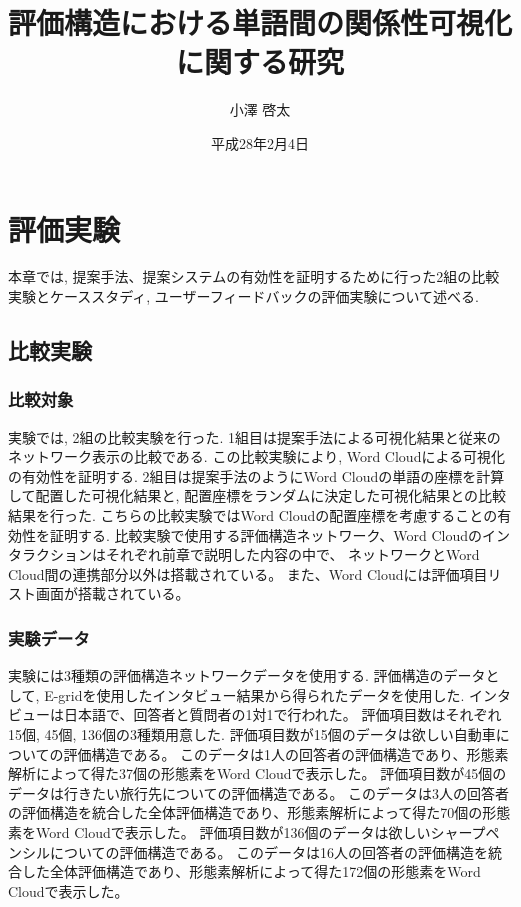 \documentclass[syuuron]{kuee}
\title{評価構造における単語間の関係性可視化に関する研究}
\author{小澤 啓太}
\date{平成28年2月4日}
\begin{document}
\maketitle
\tableofcontents


\chapter{評価実験}
	本章では, 提案手法、提案システムの有効性を証明するために行った2組の比較実験とケーススタディ, ユーザーフィードバックの評価実験について述べる. 
	\section{比較実験}
		\subsection{比較対象}
			実験では, 2組の比較実験を行った. 
			1組目は提案手法による可視化結果と従来のネットワーク表示の比較である. 
			この比較実験により, Word Cloudによる可視化の有効性を証明する. 
			2組目は提案手法のようにWord Cloudの単語の座標を計算して配置した可視化結果と, 配置座標をランダムに決定した可視化結果との比較結果を行った. 
			こちらの比較実験ではWord Cloudの配置座標を考慮することの有効性を証明する. 
			比較実験で使用する評価構造ネットワーク、Word Cloudのインタラクションはそれぞれ前章で説明した内容の中で、
			ネットワークとWord Cloud間の連携部分以外は搭載されている。
			また、Word Cloudには評価項目リスト画面が搭載されている。
			
		\subsection{実験データ}
			実験には3種類の評価構造ネットワークデータを使用する. 
			評価構造のデータとして, E-gridを使用したインタビュー結果から得られたデータを使用した.
			インタビューは日本語で、回答者と質問者の1対1で行われた。
			評価項目数はそれぞれ15個, 45個, 136個の3種類用意した. 
			評価項目数が15個のデータは欲しい自動車についての評価構造である。
			このデータは1人の回答者の評価構造であり、形態素解析によって得た37個の形態素をWord Cloudで表示した。
			評価項目数が45個のデータは行きたい旅行先についての評価構造である。
			このデータは3人の回答者の評価構造を統合した全体評価構造であり、形態素解析によって得た70個の形態素をWord Cloudで表示した。
			評価項目数が136個のデータは欲しいシャープペンシルについての評価構造である。
			このデータは16人の回答者の評価構造を統合した全体評価構造であり、形態素解析によって得た172個の形態素をWord Cloudで表示した。
		
\end{document}
